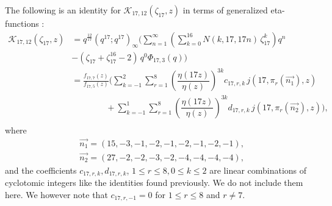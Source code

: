 \documentclass[12pt]{amsart}
\theoremstyle{definition}
\theoremstyle{remark}
\numberwithin{equation}{section}
\newcommand\Lpar[1]{\left(#1\right)}
\begin{document}
The following is an identity for $\mathcal{K}_{17,12}(\zeta_{17},z)$ in terms of generalized eta-functions :
\\
\begin{align}
\mathcal{K}_{17,12}(\zeta_{17},z)&=q^\frac{12}{17}(q^{17};q^{17})_\infty \Bigg(\sum_{n=1}^\infty \Lpar{\sum_{k=0}^{16} N(k,17,17n)\,\zeta_{17}^k}q^n \label{eq:rank17id2} \\
&-(\zeta_{17}+\zeta_{17}^{16}-2)\,q^{0} \Phi_{17,3}(q)\Bigg)
\nonumber
\\
&=\frac{f_{17,7}(z)}{f_{17,5}(z)}\Bigg(\sum_{k=-1}^{2}\sum_{r=1}^{8} \left(\dfrac{\eta(17z)}{\eta(z)}\right)^{3k}c_{17,r,k}\,j(17,\pi_r(\overrightarrow{n_1}),z)
\nonumber
\\
&\qquad\qquad+\sum_{k=-1}^{1}\sum_{r=1}^{8} \left(\dfrac{\eta(17z)}{\eta(z)}\right)^{3k}d_{17,r,k}\,j(17,\pi_r(\overrightarrow{n_2}),z)\Bigg),
\nonumber
\\
\nonumber
\end{align}
where
\begin{align*}
&\overrightarrow{n_1}=(15,-3,-1,-2,-1,-2,-1,-2,-1),
\\
&\overrightarrow{n_2}=(27,-2,-2,-3,-2,-4,-4,-4,-4),
\end{align*}
and the coefficients $c_{17,r,k}, d_{17,r,k}$, $1\leq r \leq 8, 0\leq k \leq 2$ are linear combinations of cyclotomic integers like the identities found previously. We do not include them here. We however note that $c_{17,r,-1}=0$ for $1 \leq r \leq 8$ and $r\neq 7$. 
\\\\
\end{document}
